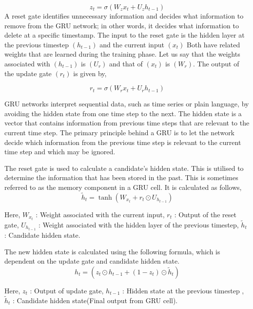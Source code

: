 \documentclass[a4paper, fleqn]{cas-sc}
\begin{document}
\begin{equation}
  z_t = \sigma(W_z x_t + U_z h_{t-1})
\end{equation}
A reset gate identifies unnecessary information and decides what information to remove from the GRU network; in other words,  it decides what information to delete at a specific timestamp. The input to the reset gate is the hidden layer at the previous timestep $(h_{t-1})$ and the current input $( x_t )$ 
Both have related weights that are learned during the training phase.  Let us say that the weights associated with $(h_{t-1})$ is $(U_r)$ and that of  $( x_t )$ is $(W_r)$.  The output of the update gate $( r_t )$ is given by, 

\begin{equation}
  r_t = \sigma(W_r x_t + U_r h_{t-1})
\end{equation}

GRU networks interpret sequential data,  such as time series or plain language,  by avoiding the hidden state from one time step to the next. The hidden state is a vector that contains information from previous time steps that are relevant to the current time step. The primary principle behind a GRU is to let the network decide which information from the previous time step is relevant to the current time step and which may be ignored.


The reset gate is used to calculate a candidate's hidden state. This is utilised to determine the information that has been stored in the past. This is sometimes referred to as the memory component in a GRU cell. It is calculated as follows, 
\begin{equation}
  \tilde{h}_t = \tanh(W_{x_{t}} + r_t \odot U_{h_{t-1}})
\end{equation}

Here,  $W_{x_{t}}$ : Weight associated with the current input,  $r_t$ : Output of the reset gate,  $U_{h_{t-1}}$ : Weight associated with the hidden layer of the previous timestep,  $\tilde{h}_t$ : Candidate hidden state.



The new hidden state is calculated using the following formula,  which is dependent on the update gate and candidate hidden state.
\begin{equation}
  {h}_t = ( z_t \odot h_{t-1} + (1- z_t)\odot \tilde{h}_t)
\end{equation}

Here,  $z_t$ : Output of update gate,  $h_{t-1}$ : Hidden state at the previous timestep , $\tilde{h}_t$ : Candidate hidden state(Final output from GRU cell).
\end{document}
